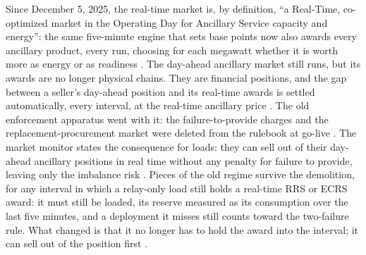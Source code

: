 Since December 5, 2025, the real-time market is, by definition, ``a Real-Time, co-optimized market in the Operating Day for Ancillary Service capacity and energy'': the same five-minute engine that sets base points now also awards every ancillary product, every run, choosing for each megawatt whether it is worth more as energy or as readiness \autocite{ercotnodalrtc2025}. %
The day-ahead ancillary market still runs, but its awards are no longer physical chains. They are financial positions, and the gap between a seller's day-ahead position and its real-time awards is settled automatically, every interval, at the real-time ancillary price \autocite{potomac2026somercot,ercotnodalrtc2025}. %
The old enforcement apparatus went with it: the failure-to-provide charges and the replacement-procurement market were deleted from the rulebook at go-live \autocite{ercotrtcbloadres2025,ercotnodalrtc2025}. %
The market monitor states the consequence for loads: they can sell out of their day-ahead ancillary positions in real time without any penalty for failure to provide, leaving only the imbalance risk \autocite{potomac2026somercot}. %
Pieces of the old regime survive the demolition, for any interval in which a relay-only load still holds a real-time RRS or ECRS award: it must still be loaded, its reserve measured as its consumption over the last five minutes, and a deployment it misses still counts toward the two-failure rule. What changed is that it no longer has to hold the award into the interval; it can sell out of the position first \autocite{ercot2026protocols,ercotnodalrtc2025}. %


